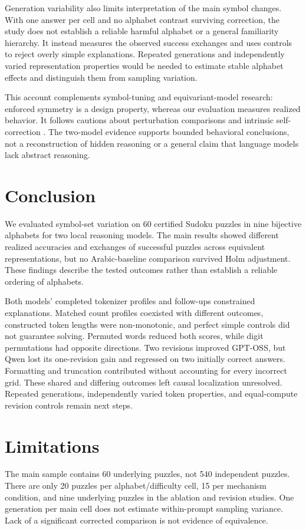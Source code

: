 \documentclass[11pt]{article}
\begin{document}
Generation variability also limits interpretation of the main symbol changes. With one answer per cell and no alphabet contrast surviving correction, the study does not establish a reliable harmful alphabet or a general familiarity hierarchy. It instead measures the observed success exchanges and uses controls to reject overly simple explanations. Repeated generations and independently varied representation properties would be needed to estimate stable alphabet effects and distinguish them from sampling variation.

This account complements symbol-tuning and equivariant-model research: enforced symmetry is a design property, whereas our evaluation measures realized behavior. It follows cautions about perturbation comparisons and intrinsic self-correction \citep{dlugosz2026earnest,huang2024selfcorrect}. The two-model evidence supports bounded behavioral conclusions, not a reconstruction of hidden reasoning or a general claim that language models lack abstract reasoning.

\section{Conclusion}
We evaluated symbol-set variation on 60 certified Sudoku puzzles in nine bijective alphabets for two local reasoning models. The main results showed different realized accuracies and exchanges of successful puzzles across equivalent representations, but no Arabic-baseline comparison survived Holm adjustment. These findings describe the tested outcomes rather than establish a reliable ordering of alphabets.

Both models' completed tokenizer profiles and follow-ups constrained explanations. Matched count profiles coexisted with different outcomes, constructed token lengths were non-monotonic, and perfect simple controls did not guarantee solving. Permuted words reduced both scores, while digit permutations had opposite directions. Two revisions improved GPT-OSS, but Qwen lost its one-revision gain and regressed on two initially correct answers. Formatting and truncation contributed without accounting for every incorrect grid. These shared and differing outcomes left causal localization unresolved. Repeated generations, independently varied token properties, and equal-compute revision controls remain next steps.

\section*{Limitations}
The main sample contains 60 underlying puzzles, not 540 independent puzzles. There are only 20 puzzles per alphabet/difficulty cell, 15 per mechanism condition, and nine underlying puzzles in the ablation and revision studies. One generation per main cell does not estimate within-prompt sampling variance. Lack of a significant corrected comparison is not evidence of equivalence.
\end{document}
